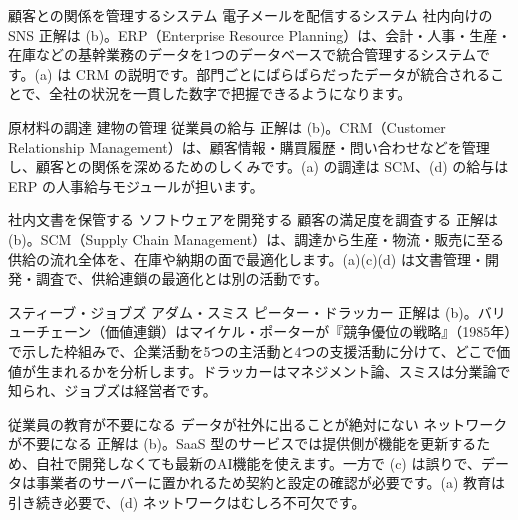
%
  {顧客との関係を管理するシステム}%
  {}%
  {電子メールを配信するシステム}%
  {社内向けのSNS}%
  {正解は (b)。ERP（Enterprise Resource Planning）は、会計・人事・生産・在庫などの基幹業務のデータを1つのデータベースで統合管理するシステムです。(a) は CRM の説明です。部門ごとにばらばらだったデータが統合されることで、全社の状況を一貫した数字で把握できるようになります。}

%
  {原材料の調達}%
  {}%
  {建物の管理}%
  {従業員の給与}%
  {正解は (b)。CRM（Customer Relationship Management）は、顧客情報・購買履歴・問い合わせなどを管理し、顧客との関係を深めるためのしくみです。(a) の調達は SCM、(d) の給与は ERP の人事給与モジュールが担います。}

%
  {社内文書を保管する}%
  {}%
  {ソフトウェアを開発する}%
  {顧客の満足度を調査する}%
  {正解は (b)。SCM（Supply Chain Management）は、調達から生産・物流・販売に至る供給の流れ全体を、在庫や納期の面で最適化します。(a)(c)(d) は文書管理・開発・調査で、供給連鎖の最適化とは別の活動です。}

%
  {スティーブ・ジョブズ}%
  {}%
  {アダム・スミス}%
  {ピーター・ドラッカー}%
  {正解は (b)。バリューチェーン（価値連鎖）はマイケル・ポーターが『競争優位の戦略』（1985年）で示した枠組みで、企業活動を5つの主活動と4つの支援活動に分けて、どこで価値が生まれるかを分析します。ドラッカーはマネジメント論、スミスは分業論で知られ、ジョブズは経営者です。}

%
  {従業員の教育が不要になる}%
  {}%
  {データが社外に出ることが絶対にない}%
  {ネットワークが不要になる}%
  {正解は (b)。SaaS 型のサービスでは提供側が機能を更新するため、自社で開発しなくても最新のAI機能を使えます。一方で (c) は誤りで、データは事業者のサーバーに置かれるため契約と設定の確認が必要です。(a) 教育は引き続き必要で、(d) ネットワークはむしろ不可欠です。}
